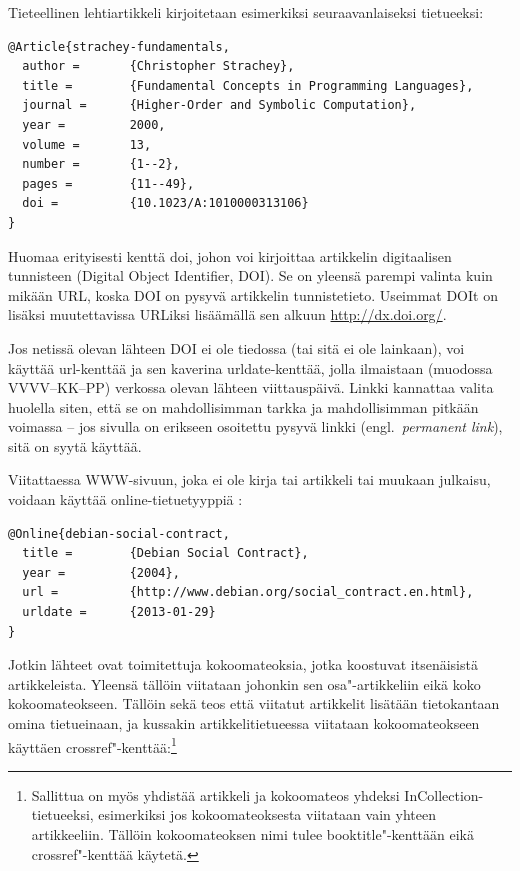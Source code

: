 \documentclass[utf8,bachelor]{gradu3}
\begin{document}
Tieteellinen lehtiartikkeli \parencite[esim.][]{strachey-fundamentals}
kirjoitetaan esimerkiksi seuraavanlaiseksi tietueeksi:

\begingroup\footnotesize
\begin{verbatim}
@Article{strachey-fundamentals,
  author =       {Christopher Strachey},
  title =        {Fundamental Concepts in Programming Languages},
  journal =      {Higher-Order and Symbolic Computation},
  year =         2000,
  volume =       13,
  number =       {1--2},
  pages =        {11--49},
  doi =          {10.1023/A:1010000313106}
}
\end{verbatim}
\endgroup

Huomaa erityisesti kenttä doi, johon voi kirjoittaa artikkelin
digitaalisen tunnisteen (Digital Object Identifier, DOI).  Se on
yleensä parempi valinta kuin mikään URL, koska DOI on pysyvä
artikkelin tunnistetieto.  Useimmat DOIt on lisäksi muutettavissa
URLiksi lisäämällä sen alkuun \url{http://dx.doi.org/}.

Jos netissä olevan lähteen DOI ei ole tiedossa (tai sitä ei ole
lainkaan), voi käyttää url-kenttää ja sen kaverina urldate-kenttää,
jolla ilmaistaan (muodossa VVVV--KK--PP) verkossa olevan lähteen
viittauspäivä.  Linkki kannattaa valita huolella siten, että se on
mahdollisimman tarkka ja mahdollisimman pitkään voimassa -- jos
sivulla on erikseen osoitettu pysyvä linkki (engl.~\emph{permanent
  link}), sitä on syytä käyttää.

Viitattaessa WWW-sivuun, joka ei ole kirja tai artikkeli tai muukaan
julkaisu, voidaan käyttää
online-tietuetyyppiä \parencite[esim.][]{debian-social-contract}:

\begingroup\footnotesize
\begin{verbatim}
@Online{debian-social-contract,
  title =        {Debian Social Contract},
  year =         {2004},
  url =          {http://www.debian.org/social_contract.en.html},
  urldate =      {2013-01-29}
}
\end{verbatim}
\endgroup

Jotkin lähteet ovat toimitettuja kokoomateoksia, jotka koostuvat
itsenäisistä artikkeleista.  Yleensä tällöin viitataan johonkin sen
osa"-artikkeliin \parencite[esim.][]{prechelt-credibility} eikä koko
kokoomateokseen.  Tällöin sekä teos että viitatut artikkelit lisätään
tietokantaan omina tietueinaan, ja kussakin artikkelitietueessa
viitataan kokoomateokseen käyttäen
crossref"-kenttää:\footnote{Sallittua on myös yhdistää artikkeli ja
  kokoomateos yhdeksi InCollection-tietueeksi, esimerkiksi jos
  kokoomateoksesta viitataan vain yhteen artikkeeliin.  Tällöin
  kokoomateoksen nimi tulee booktitle"-kenttään eikä crossref"-kenttää
  käytetä.}
\end{document}
